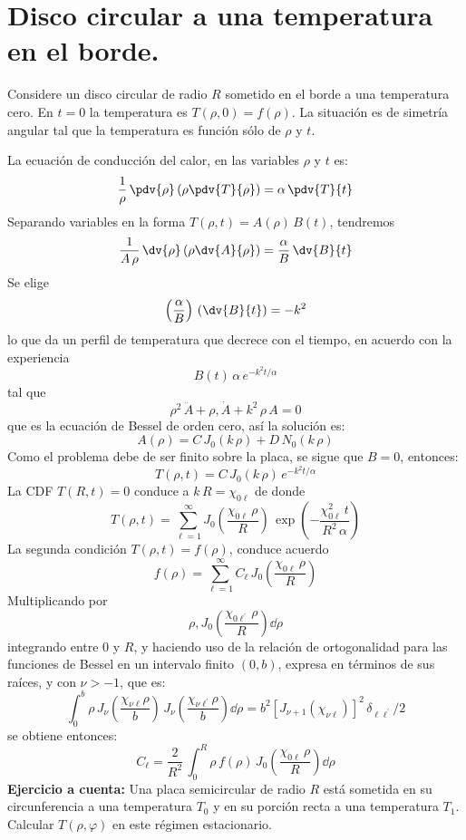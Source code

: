 \section{Disco circular a una temperatura en el borde.}
Considere un disco circular de radio $R$ sometido en el borde a una temperatura cero. En $t = 0$ la temperatura es $T (\rho, 0) = f (\rho)$. La situación es de simetría angular tal que la temperatura es función sólo de $\rho$ y $t$.
\par
La ecuación de conducción del calor, en las variables $\rho$ y $t$ es:
\[ \dfrac{1}{\rho} \, \pdv{\rho} \left( \rho \pdv{T}{\rho} \right) = \alpha \, \pdv{T}{t}  \]
Separando variables en la forma $T(\rho, t) = A(\rho) \, B(t)$, tendremos
\[ \dfrac{1}{A \, \rho} \, \dv{\rho} \left( \rho \dv{A}{\rho} \right) = \dfrac{\alpha}{B} \, \dv{B}{t} \]
Se elige
\[ \left( \dfrac{\alpha}{B} \right) \, \left( \dv{B}{t} \right) = -k^{2} \]
lo que da un perfil de temperatura que decrece con el tiempo, en acuerdo con la experiencia
\[ B(t) \, \alpha \, e^{-k^{2} t /\alpha} \]
tal que
\[ \rho^{2} \, \ddot{A} + \rho , \dot{A} + k^{2} \, \rho \, A = 0 \]
que es la ecuación de Bessel de orden cero, así la solución es:
\[ A(\rho) =  C \, J_{0} (k \, \rho) + D \, N_{0} (k \, \rho) \]
Como el problema debe de ser finito sobre la placa, se sigue que $B = 0$, entonces:
\[ T (\rho, t) =  C \, J_{0} (k \, \rho) \, e^{-k^{2} t / \alpha} \]
La CDF $T(R, t) = 0$ conduce a $k \, R = \chi_{0 \ell}$ de donde
\[ T (\rho, t) = \sum_{\ell=1}^{\infty} J_{0} \left( \dfrac{\chi_{0 \ell} \, \rho}{R} \right) \, \exp  \left( - \dfrac{\chi_{0 \ell}^{2} \, t}{R^{2} \, \alpha} \right) \] 
La segunda condición $T(\rho, t) = f(\rho)$, conduce acuerdo
\[ f(\rho) = \sum_{\ell=1}^{\infty} C_{\ell} \, J_{0} \left( \dfrac{\chi_{0 \ell} \, \rho}{R} \right) \]
Multiplicando por 
\[ \rho, J_{0} \left( \dfrac{\chi_{0 \ell^{\prime}} \, \rho}{R} \right) 
\dd \rho \]
integrando entre $0$ y $R$, y haciendo uso de la relación de ortogonalidad para las funciones de Bessel en un intervalo finito $(0,b)$, expresa en términos de sus raíces, y con $\nu > -1$, que es:
\[ \int_{0}^{b} \rho \, J_{\nu} \left( \dfrac{\chi_{\nu \ell} \rho}{b}  \right) \, J_{\nu} \left( \dfrac{\chi_{\nu \ell^{\prime}} \rho}{b} \right) \dd \rho = b^{2} \left[ J_{\nu + 1} (\chi_{\nu \ell}) \right]^{2} \, \delta_{\ell \ell^{\prime}} /2 \]
se obtiene entonces:
\[ C_{\ell} =  \dfrac{2}{R^{2}} \, \int_{0}^{R} \rho \, f(\rho) \, J_{0} \left( \dfrac{\chi_{0 \ell} \, \rho}{R} \right) \dd \rho \]
\textbf{Ejercicio a cuenta: } Una placa semicircular de radio $R$ está sometida en su circunferencia a una temperatura $T_{0}$ y en su porción recta a una temperatura $T_{1}$. Calcular $T(\rho, \varphi)$ en este régimen estacionario.
